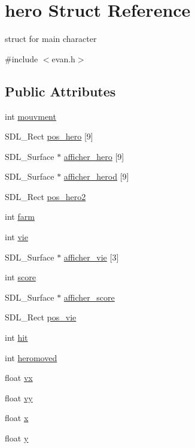 \hypertarget{structhero}{}\section{hero Struct Reference}
\label{structhero}


struct for main character  




{\ttfamily \#include $<$evan.\+h$>$}

\subsection*{Public Attributes}
\begin{DoxyCompactItemize}
\item 
int \hyperlink{structhero_a2e29e9bbf40ce21c919020cab377c459}{mouvment}
\item 
S\+D\+L\+\_\+\+Rect \hyperlink{structhero_a3cf2835573057cabad180f997bb25f8e}{pos\+\_\+hero} \mbox{[}9\mbox{]}
\item 
S\+D\+L\+\_\+\+Surface $\ast$ \hyperlink{structhero_abb55d138bcf98636f5763bc8db7a8aa2}{afficher\+\_\+hero} \mbox{[}9\mbox{]}
\item 
S\+D\+L\+\_\+\+Surface $\ast$ \hyperlink{structhero_ab431a85460c9aef090c04b9841bbedfa}{afficher\+\_\+herod} \mbox{[}9\mbox{]}
\item 
S\+D\+L\+\_\+\+Rect \hyperlink{structhero_ae21dc2bbecf1ef9b41ca5258ca0c4c9c}{pos\+\_\+hero2}
\item 
int \hyperlink{structhero_a864bf6a159fba501fca768cc17c5f7e4}{farm}
\item 
int \hyperlink{structhero_a5887140c26217e8f45870ee09224ff94}{vie}
\item 
S\+D\+L\+\_\+\+Surface $\ast$ \hyperlink{structhero_a86b652820928a82177c0413233df0e8c}{afficher\+\_\+vie} \mbox{[}3\mbox{]}
\item 
int \hyperlink{structhero_ad95606e4c167095066a7d314620d99b5}{score}
\item 
S\+D\+L\+\_\+\+Surface $\ast$ \hyperlink{structhero_abf045ab06209db5a3a2d5282461a023d}{afficher\+\_\+score}
\item 
S\+D\+L\+\_\+\+Rect \hyperlink{structhero_adbe4f5c90c7c4d99292c65d50dad02b7}{pos\+\_\+vie}
\item 
int \hyperlink{structhero_a38a0e660a12c2d6509a6183d05cd135b}{hit}
\item 
int \hyperlink{structhero_ae9fbc87f80d82150fadd3fb20c86bbb0}{heromoved}
\item 
float \hyperlink{structhero_a79f3a7c2bf2a8e40bc1840c4bc0502a7}{vx}
\item 
float \hyperlink{structhero_ac9881c9f77d187cba2636f7ed355cb1a}{vy}
\item 
float \hyperlink{structhero_a26083549c9ec31f32cedef617ab76c8e}{x}
\item 
float \hyperlink{structhero_a0cfaf220a87419e9488fd84213340d03}{y}
\end{DoxyCompactItemize}


